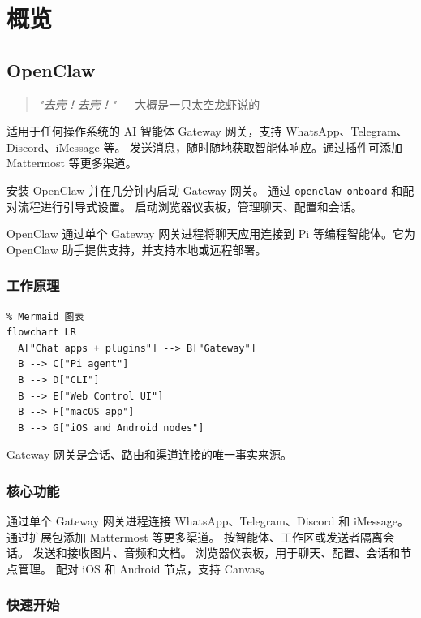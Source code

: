 \chapter{概览}

\section{OpenClaw}



\begin{quote}
\textit{"去壳！去壳！"} — 大概是一只太空龙虾说的
\end{quote}


适用于任何操作系统的 AI 智能体 Gateway 网关，支持 WhatsApp、Telegram、Discord、iMessage 等。
发送消息，随时随地获取智能体响应。通过插件可添加 Mattermost 等更多渠道。

安装 OpenClaw 并在几分钟内启动 Gateway 网关。
通过 \texttt{openclaw onboard} 和配对流程进行引导式设置。
启动浏览器仪表板，管理聊天、配置和会话。

OpenClaw 通过单个 Gateway 网关进程将聊天应用连接到 Pi 等编程智能体。它为 OpenClaw 助手提供支持，并支持本地或远程部署。

\subsection{工作原理}


\begin{verbatim}
% Mermaid 图表
flowchart LR
  A["Chat apps + plugins"] --> B["Gateway"]
  B --> C["Pi agent"]
  B --> D["CLI"]
  B --> E["Web Control UI"]
  B --> F["macOS app"]
  B --> G["iOS and Android nodes"]
\end{verbatim}


Gateway 网关是会话、路由和渠道连接的唯一事实来源。

\subsection{核心功能}


通过单个 Gateway 网关进程连接 WhatsApp、Telegram、Discord 和 iMessage。
通过扩展包添加 Mattermost 等更多渠道。
按智能体、工作区或发送者隔离会话。
发送和接收图片、音频和文档。
浏览器仪表板，用于聊天、配置、会话和节点管理。
配对 iOS 和 Android 节点，支持 Canvas。

\subsection{快速开始}


